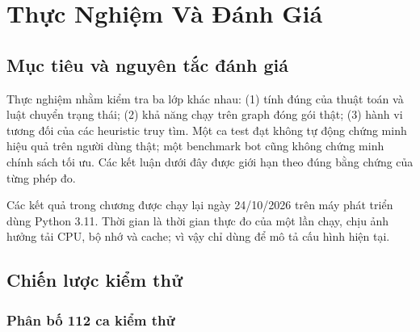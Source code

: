 \chapter{Thực Nghiệm Và Đánh Giá}

\section{Mục tiêu và nguyên tắc đánh giá}

Thực nghiệm nhằm kiểm tra ba lớp khác nhau: (1) tính đúng của thuật toán và luật
chuyển trạng thái; (2) khả năng chạy trên graph đóng gói thật; (3) hành vi tương
đối của các heuristic truy tìm. Một ca test đạt không tự động chứng minh hiệu quả
trên người dùng thật; một benchmark bot cũng không chứng minh chính sách tối ưu.
Các kết luận dưới đây được giới hạn theo đúng bằng chứng của từng phép đo.

Các kết quả trong chương được chạy lại ngày 24/10/2026 trên máy phát triển dùng
Python 3.11. Thời gian là thời gian thực đo của một lần chạy, chịu ảnh hưởng tải
CPU, bộ nhớ và cache; vì vậy chỉ dùng để mô tả cấu hình hiện tại.

\section{Chiến lược kiểm thử}

\subsection{Phân bố 112 ca kiểm thử}

